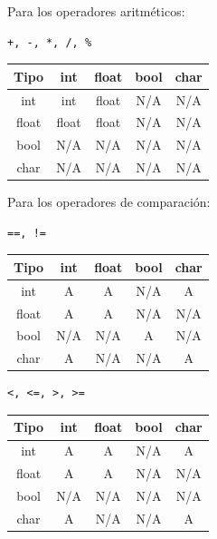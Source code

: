 \documentclass[11pt, spanish]{report}
\begin{document}
Para los operadores aritm\'eticos: 

\begin{verbatim} 
+, -, *, /, % 
\end{verbatim}

\begin{table}[!hbp]
  \begin{tabular}{c c c c c}
    \hline            
    Tipo  & int   & float & bool & char \\ [0.5ex]
    \hline                         
    int   & int   & float & N/A  & N/A \\        
    float & float & float & N/A  & N/A \\
    bool  & N/A   & N/A   & N/A  & N/A \\
    char  & N/A   & N/A   & N/A  & N/A \\ [1ex]
    \hline
  \end{tabular}    
\end{table}
  
Para los operadores de comparaci\'on:

\begin{verbatim} 
==, !=
\end{verbatim}

\begin{table}[!hbp]
  \begin{tabular}{c c c c c}
    \hline            
    Tipo  & int & float & bool & char \\ [0.5ex]
    \hline                         
    int   & A   & A     & N/A  & A \\        
    float & A   & A     & N/A  & N/A \\
    bool  & N/A & N/A   & A    & N/A \\
    char  & A   & N/A   & N/A  & A \\ [1ex]
    \hline                         
  \end{tabular}    
\end{table}

\begin{verbatim} 
<, <=, >, >= 
\end{verbatim}

\begin{table}[!hbp]
  \begin{tabular}{c c c c c}
    \hline            
    Tipo  & int & float & bool & char \\ [0.5ex]
    \hline                         
    int   & A   & A     & N/A  & A \\        
    float & A   & A     & N/A  & N/A \\
    bool  & N/A & N/A   & N/A  & N/A \\
    char  & A   & N/A   & N/A  & A \\ [1ex]
    \hline                         
  \end{tabular}    
\end{table}
\end{document}
